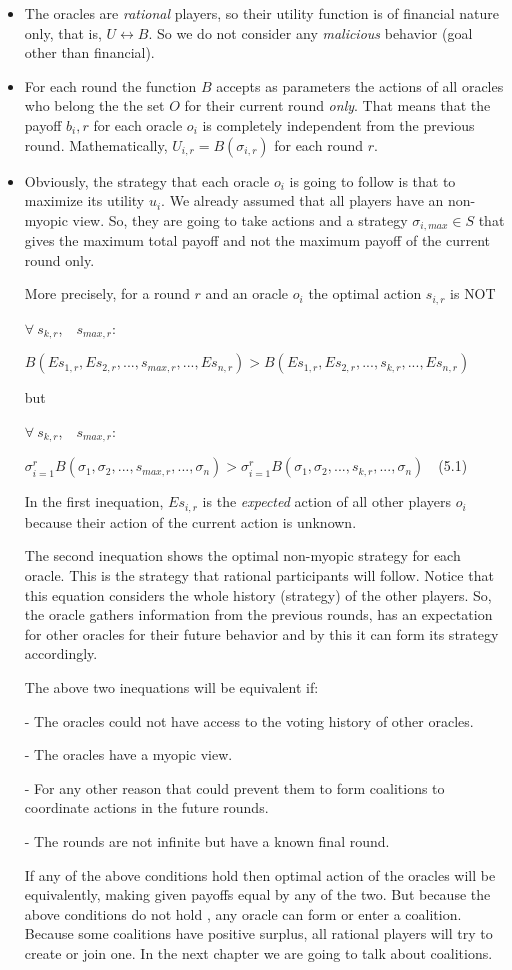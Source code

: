 \documentclass{article}
\begin{document}
\begin{itemize}
\item The oracles are \emph{rational} players, so their utility function is of financial nature only, that is, $U\leftrightarrow B$. So we do not consider any \emph{malicious} behavior (goal other than financial).
\item For each round the function $B$ accepts as parameters the actions of all oracles who belong the the set $O$ for their current round \emph{only}. That means that the payoff $b_i,r$ for each oracle $o_i$ is completely independent from the previous round. Mathematically, $U_{i,r} = B(\sigma_{i,r})$ for each round $r$. 
\item Obviously, the strategy that each oracle $o_i$ is going to follow is that to maximize its utility $u_i$. We already assumed that all players have an non-myopic view. So, they are going to take actions and a strategy $\sigma_{i,max} \in S$ that gives the maximum total payoff and not the maximum payoff of the current round only.
\par More precisely, for a round $r$ and an oracle $o_i$ the optimal action $s_{i,r}$ is \large{NOT}
\par $\forall~s_{k,r}$,~~$s_{max,r}:$\par $B(Es_{1,r},Es_{2,r},...,s_{max,r},...,Es_{n,r})>
B(Es_{1,r},Es_{2,r},...,s_{k,r},...,Es_{n,r})$
\par but
\par $\forall~s_{k,r}$,~~$s_{max,r}:$\par
$\sigma^{r}_{i=1}B(\sigma_1,\sigma_2,...,s_{max,r},...,\sigma_n)>
\sigma^{r}_{i=1}B(\sigma_1,\sigma_2,...,s_{k,r},...,\sigma_n)$~~(5.1)
\par In the first inequation, $Es_{i,r}$ is the \emph{expected} action of all other players $o_i$ because their action of the current action is unknown.
\par The second inequation shows the optimal non-myopic strategy for each oracle. This is the strategy that rational participants will follow. Notice that this equation considers the whole history (strategy) of the other players. So, the oracle gathers information from the previous rounds, has an expectation for other oracles for their future behavior and by this it can form its strategy accordingly.
\par The above two inequations will be equivalent if:
\par - The oracles could not have access to the voting history of other oracles.
\par - The oracles have a myopic view.
\par - For any other reason that could prevent them to form coalitions to coordinate actions in the future rounds.
\par - The rounds are not infinite but have a known final round.
\par If any of the above conditions  hold then optimal action of the oracles will be equivalently, making given payoffs equal by any of the two. But because the above conditions do not hold , any oracle can form or enter a coalition. Because some coalitions have positive surplus, all rational players will try to create or join one. In the next chapter we are going to talk about coalitions.


\end{itemize}
\end{document}
